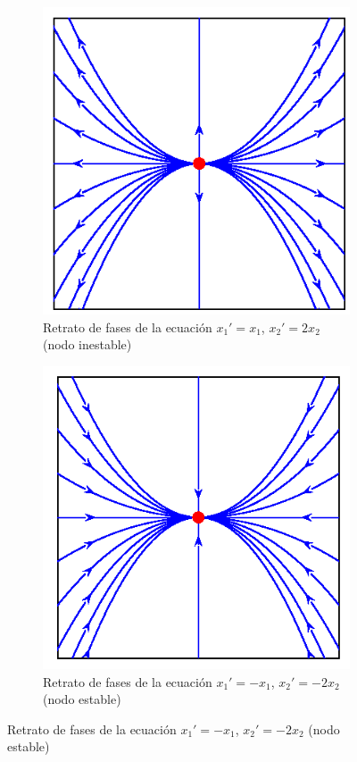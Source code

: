 \begin{figure}[h]
 
\begin{subfigure}{.5\textwidth}
\begin{center}
\includegraphics[scale=.5]{imagenes/nodo_ine.png}
\end{center}
\caption{Retrato de fases de la ecuación $x_1'=x_1$,
$x_2'=2x_2$ (nodo inestable)}\label{fig:nodo_ine}
\end{subfigure}
\begin{subfigure}{.5\textwidth}
\begin{center}
\includegraphics[scale=.5]{imagenes/nodo_est.png}
\end{center}
\caption{Retrato de fases de la ecuación $x_1'=-x_1$,
$x_2'=-2x_2$ (nodo estable)}\label{fig:nodo_est}
\end{subfigure}


\end{figure}

